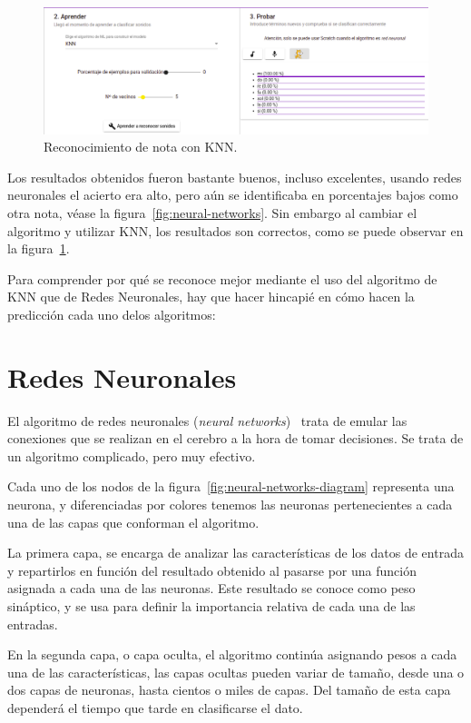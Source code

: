 \documentclass[a4paper, 12pt]{book}
\begin{document}
\begin{figure}
	\centering
	\includegraphics[width=14cm]{img/knn1.png}
	\caption{Reconocimiento de nota con KNN.}\label{fig:knn}
\end{figure}

Los resultados obtenidos fueron bastante buenos, incluso excelentes, usando redes neuronales el acierto era alto, pero aún se identificaba en porcentajes bajos como otra nota, véase la figura~\ref{fig:neural-networks}. Sin embargo al cambiar el algoritmo y utilizar KNN, los resultados son correctos, como se puede observar en la figura~\ref{fig:knn}.

Para comprender por qué se reconoce mejor mediante el uso del algoritmo de KNN que de Redes Neuronales, hay que hacer hincapié en cómo hacen la predicción cada uno delos algoritmos:

\section*{Redes Neuronales}
\label{sec:neural-networks}

El algoritmo de redes neuronales (\textit{neural networks})~\cite{izaurieta2000redes} trata de emular las conexiones que se realizan en el cerebro a la hora de tomar decisiones. Se trata de un algoritmo complicado, pero muy efectivo.

Cada uno de los nodos de la figura~\ref{fig:neural-networks-diagram} representa una neurona, y diferenciadas por colores tenemos las neuronas pertenecientes a cada una de las capas que conforman el algoritmo.

La primera capa, se encarga de analizar las características de los datos de entrada y repartirlos en función del resultado obtenido al pasarse por una función asignada a cada una de las neuronas. Este resultado se conoce como peso sináptico, y se usa para definir la importancia relativa de cada una de las entradas.

En la segunda capa, o capa oculta, el algoritmo continúa asignando pesos a cada una de las características, las capas ocultas pueden variar de tamaño, desde una o dos capas de neuronas, hasta cientos o miles de capas. Del tamaño de esta capa dependerá el tiempo que tarde en clasificarse el dato.
\end{document}
